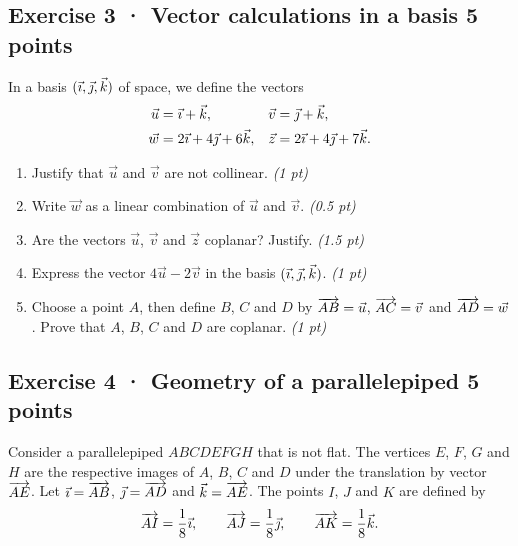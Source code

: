 \clearpage{}\par

\subsection*{Exercise 3 · Vector calculations in a basis \hfill 5 points}In a basis $(\vec{\imath},\vec{\jmath},\vec k)$ of space, we define the vectors
\[\begin{aligned}\vec u&=\vec{\imath}+\vec k,&\vec v&=\vec{\jmath}+\vec k,\\
\vec w&=2\vec{\imath}+4\vec{\jmath}+6\vec k,&\vec z&=2\vec{\imath}+4\vec{\jmath}+7\vec k.\end{aligned}\]

\begin{enumerate}

\item Justify that $\vec u$ and $\vec v$ are not collinear. \hfill\textit{(1 pt)}

\item Write $\vec w$ as a linear combination of $\vec u$ and $\vec v$. \hfill\textit{(0.5 pt)}

\item Are the vectors $\vec u$, $\vec v$ and $\vec z$ coplanar? Justify. \hfill\textit{(1.5 pt)}

\item Express the vector $4\vec u-2\vec v$ in the basis $(\vec{\imath},\vec{\jmath},\vec k)$. \hfill\textit{(1 pt)}

\item Choose a point $A$, then define $B$, $C$ and $D$ by $\overrightarrow{AB}=\vec u$, $\overrightarrow{AC}=\vec v$ and $\overrightarrow{AD}=\vec w$. Prove that $A$, $B$, $C$ and $D$ are coplanar. \hfill\textit{(1 pt)}

\end{enumerate}

\subsection*{Exercise 4 · Geometry of a parallelepiped \hfill 5 points}Consider a parallelepiped $ABCDEFGH$ that is not flat. The vertices $E$, $F$, $G$ and $H$ are the respective images of $A$, $B$, $C$ and $D$ under the translation by vector $\overrightarrow{AE}$.
Let $\vec{\imath}=\overrightarrow{AB}$, $\vec{\jmath}=\overrightarrow{AD}$ and $\vec k=\overrightarrow{AE}$.
The points $I$, $J$ and $K$ are defined by
\[\overrightarrow{AI}=\frac1{8}\vec{\imath},\qquad\overrightarrow{AJ}=\frac1{8}\vec{\jmath},\qquad\overrightarrow{AK}=\frac1{8}\vec k.\]


